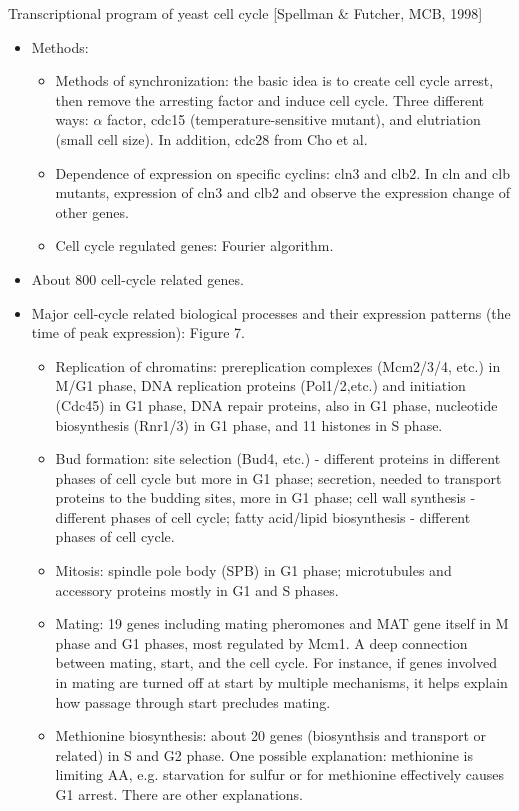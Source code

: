 \documentclass{report}
\begin{document}
Transcriptional program of yeast cell cycle [Spellman \& Futcher, MCB, 1998]
\begin{itemize}
	\item Methods: 
	\begin{itemize}
		\item Methods of synchronization: the basic idea is to create cell cycle arrest, then remove the arresting factor and induce cell cycle. Three different ways: $\alpha$ factor, cdc15 (temperature-sensitive mutant), and elutriation (small cell size). In addition, cdc28 from Cho et al.
		\item Dependence of expression on specific cyclins: cln3 and clb2. In cln and clb mutants, expression of cln3 and clb2 and observe the expression change of other genes. 
		\item Cell cycle regulated genes: Fourier algorithm. 
	\end{itemize}
	
	\item About 800 cell-cycle related genes. 
	
	\item Major cell-cycle related biological processes and their expression patterns (the time of peak expression): Figure 7.
	\begin{itemize}
		\item Replication of chromatins: prereplication complexes (Mcm2/3/4, etc.) in M/G1 phase, DNA replication proteins (Pol1/2,etc.) and initiation (Cdc45) in G1 phase, DNA repair proteins, also in G1 phase, nucleotide biosynthesis (Rnr1/3) in G1 phase, and 11 histones in S phase. 
		\item Bud formation: site selection (Bud4, etc.) - different proteins in different phases of cell cycle but more in G1 phase; secretion, needed to transport proteins to the budding sites, more in G1 phase; cell wall synthesis - different phases of cell cycle; fatty acid/lipid biosynthesis - different phases of cell cycle. 
		\item Mitosis: spindle pole body (SPB) in G1 phase; microtubules and accessory proteins mostly in G1 and S phases. 
		\item Mating: 19 genes including mating pheromones and MAT gene itself in M phase and G1 phases, most regulated by Mcm1. A deep connection between mating, start, and the cell cycle. For instance, if genes involved in mating are turned off at start by multiple mechanisms, it helps explain how passage through start precludes mating.
		\item Methionine biosynthesis: about 20 genes (biosynthsis and transport or related) in S and G2 phase. One possible explanation: methionine is limiting AA, e.g. starvation for sulfur or for methionine effectively causes G1 arrest. There are other explanations. 
	\end{itemize}
	

\end{itemize}
\end{document}
